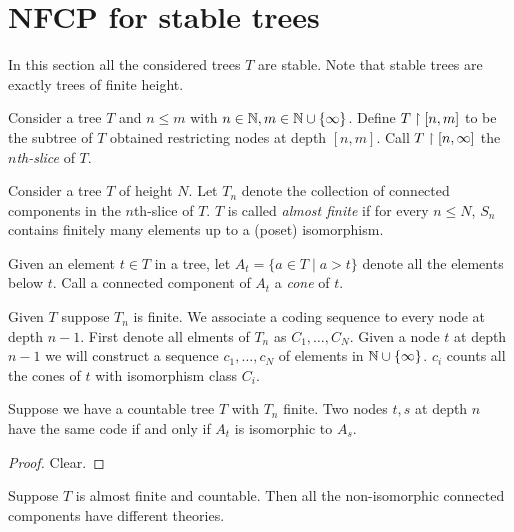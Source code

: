 \documentclass{amsart}
\begin{document}
\section{NFCP for stable trees}
In this section all the considered trees $T$ are stable. Note that stable trees are exactly trees of finite height.

\begin{Definition}
Consider a tree $T$ and $n \leq m$ with $n \in \mathbb{N}, m \in \mathbb{N} \cup \{\infty\}$. Define $T \upharpoonright [n,m]$ to be the subtree of $T$ obtained restricting nodes at depth $[n,m]$. Call $T \upharpoonright [n, \infty]$ the \emph{$n$th-slice} of $T$.
\end{Definition}

\begin{Definition}
	Consider a tree $T$ of height $N$. Let $T_n$ denote the collection of connected components in the $n$th-slice of $T$. $T$ is called \emph{almost finite} if for every $n \leq N$, $S_n$ contains finitely many elements up to a (poset) isomorphism.
\end{Definition}

\begin{Definition}
	Given an element $t \in T$ in a tree, let $A_t = \{a \in T \mid a > t\}$ denote all the elements below $t$. Call a connected component of $A_t$ a \emph{cone} of $t$.
\end{Definition}

Given $T$ suppose $T_n$ is finite. We associate a coding sequence to every node at depth $n-1$. First denote all elments of $T_n$ as $C_1, \ldots, C_N$. Given a node $t$ at depth $n-1$ we will construct a sequence $c_1, \ldots, c_N$ of elements in $\mathbb{N} \cup \{\infty\}$. $c_i$ counts all the cones of $t$ with isomorphism class $C_i$.

\begin{Lemma} \label{lm_tree_code}
	Suppose we have a countable tree $T$ with $T_n$ finite. Two nodes $t,s$ at depth $n$ have the same code if and only if $A_t$ is isomorphic to $A_s$.
\end{Lemma}

\begin{proof}
	Clear.
\end{proof}

\begin{Lemma} \label{lm_categoricity}
	Suppose $T$ is almost finite and countable. Then all the non-isomorphic connected components have different theories.
\end{Lemma}
\end{document}
